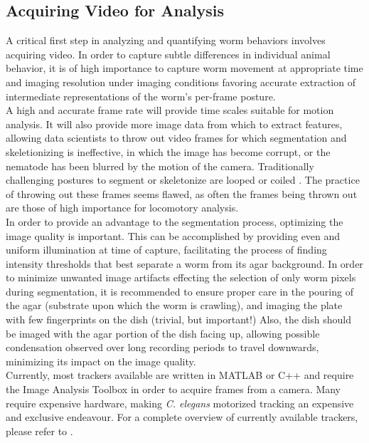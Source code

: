 \documentclass[main.tex]{subfiles}
\begin{document}
\subsection{Acquiring Video for Analysis}
A critical first step in analyzing and quantifying worm behaviors involves acquiring video. In order to capture subtle differences in individual animal behavior, it is of high importance to capture worm movement at appropriate time and imaging resolution under imaging conditions favoring accurate extraction of intermediate representations of the worm's per-frame posture. \\

A high and accurate frame rate will provide time scales suitable for motion analysis. It will also provide more image data from which to extract features, allowing data scientists to throw out video frames for which segmentation and skeletionizing is ineffective, in which the image has become corrupt, or the nematode has been blurred by the motion of the camera. Traditionally challenging postures to segment or skeletonize are looped or coiled \cite{huang2006}. The practice of throwing out these frames seems flawed, as often the frames being thrown out are those of high importance for locomotory analysis.\\

In order to provide an advantage to the segmentation process, optimizing the image quality is important. This can be accomplished by providing even and uniform illumination at time of capture, facilitating the process of finding intensity thresholds that best separate a worm from its agar background. In order to minimize unwanted image artifacts effecting the selection of only worm pixels during segmentation, it is recommended to ensure proper care in the pouring of the agar (substrate upon which the worm is crawling), and imaging the plate with few fingerprints on the dish (trivial, but important!) Also, the dish should be imaged with the agar portion of the dish facing up, allowing possible condensation observed over long recording periods to travel downwards, minimizing its impact on the image quality.\\

Currently, most trackers available are written in MATLAB or C++ and require the Image Analysis Toolbox in order to acquire frames from a camera. Many require expensive hardware, making \textit{C. elegans} motorized tracking an expensive and exclusive endeavour. For a complete overview of currently available trackers, please refer to \cite{husson2005}.\\ 
\end{document}
